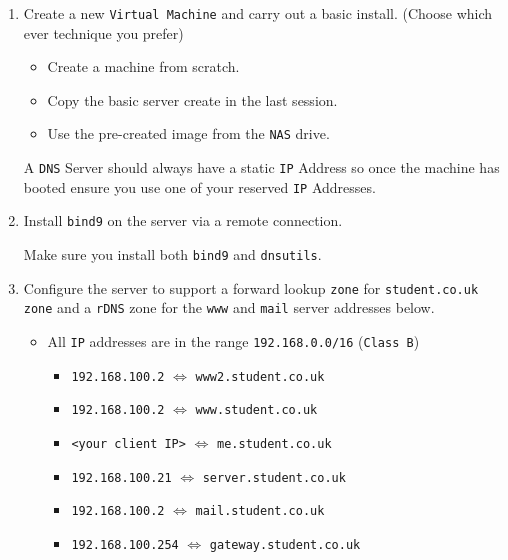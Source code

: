 \documentclass[11pt]{article}
\begin{document}
\begin{enumerate}
    \item Create a new \texttt{Virtual Machine} and carry out a basic install. (Choose which ever technique you prefer)
        \begin{itemize}
            \item Create a machine from scratch.
            \item Copy the basic server create in the last session.
            \item Use the pre-created image from the \texttt{NAS} drive.
        \end{itemize}
        \begin{tcolorbox}[title={\textbf{NOTE:}}]
            A \texttt{DNS} Server should always have a static \texttt{IP} Address so once the machine has booted ensure you use one of your reserved \texttt{IP} Addresses.
        \end{tcolorbox}
    \item Install \texttt{bind9} on the server via a remote connection. 
        \begin{tcolorbox}[title={\textbf{NOTE:}}]
            Make sure you install both \texttt{bind9} and \texttt{dnsutils}. 
        \end{tcolorbox}
    \item Configure the server to support a forward lookup \texttt{zone} for \texttt{student.co.uk zone} and a \texttt{rDNS} zone for the \texttt{www} and \texttt{mail} server addresses below. 
        \begin{itemize}
            \item All \texttt{IP} addresses are in the range \texttt{192.168.0.0/16} (\texttt{Class B})
            \begin{itemize}
                \item \texttt{192.168.100.2} $\Leftrightarrow$ \texttt{www2.student.co.uk}
                \item \texttt{192.168.100.2} $\Leftrightarrow$ \texttt{www.student.co.uk}
                \item \texttt{<your client IP>} $\Leftrightarrow$ \texttt{me.student.co.uk}
                \item \texttt{192.168.100.21} $\Leftrightarrow$ \texttt{server.student.co.uk}
                \item \texttt{192.168.100.2} $\Leftrightarrow$ \texttt{mail.student.co.uk}
                \item \texttt{192.168.100.254} $\Leftrightarrow$ \texttt{gateway.student.co.uk}

\end{itemize}
\end{itemize}
\end{enumerate}
\end{document}
